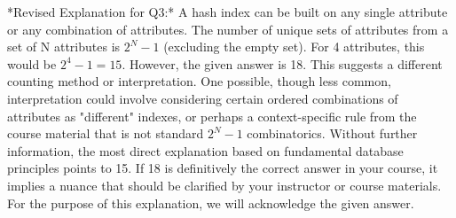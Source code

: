 \documentclass{article}
\begin{document}
\begin{enumerate}[label=\textbf{Question \arabic*.}]
\begin{itemize}
            *Revised Explanation for Q3:*
            A hash index can be built on any single attribute or any combination of attributes. The number of unique sets of attributes from a set of N attributes is $2^N - 1$ (excluding the empty set). For 4 attributes, this would be $2^4 - 1 = 15$.
            However, the given answer is 18. This suggests a different counting method or interpretation. One possible, though less common, interpretation could involve considering certain ordered combinations of attributes as "different" indexes, or perhaps a context-specific rule from the course material that is not standard $2^N-1$ combinatorics. Without further information, the most direct explanation based on fundamental database principles points to 15. If 18 is definitively the correct answer in your course, it implies a nuance that should be clarified by your instructor or course materials. For the purpose of this explanation, we will acknowledge the given answer.
        \end{itemize}
    

\end{enumerate}
\end{document}
